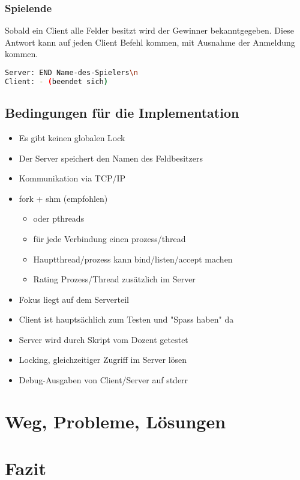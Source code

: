 \subsection{Spielende}
Sobald ein Client alle Felder besitzt wird der Gewinner bekanntgegeben. Diese Antwort kann auf jeden Client Befehl kommen, mit Ausnahme der Anmeldung kommen.
\begin{lstlisting}[language=bash,caption={Spielstart}]
Server: END Name-des-Spielers\n
Client: - (beendet sich)
\end{lstlisting}

\section{Bedingungen für die Implementation}
\begin{itemize}
	\item Es gibt keinen globalen Lock
	\item Der Server speichert den Namen des Feldbesitzers
	\item Kommunikation via TCP/IP
	\item fork + shm (empfohlen)
	\begin{itemize}
		\item oder pthreads
		\item für jede Verbindung einen prozess/thread
		\item Hauptthread/prozess kann bind/listen/accept machen
		\item Rating Prozess/Thread zusätzlich im Server
	\end{itemize}
	\item Fokus liegt auf dem Serverteil
	\item Client ist hauptsächlich zum Testen und "Spass haben" da
	\item Server wird durch Skript vom Dozent getestet
	\item Locking, gleichzeitiger Zugriff im Server lösen
	\item Debug-Ausgaben von Client/Server auf stderr
\end{itemize}

\chapter{Weg, Probleme, Lösungen}

\chapter{Fazit}
 